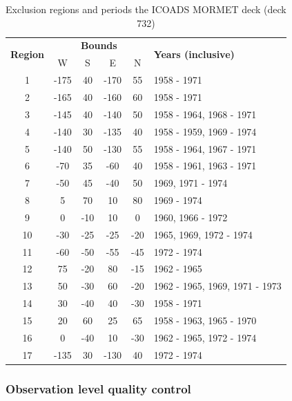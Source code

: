 \begin{table}
\centering
\caption{Exclusion regions and periods the ICOADS MORMET deck (deck 732)}
\label{tab:mormet}
\begin{tabular}{|c|c|c|c|c|l|}
\hline
\multirow{2}{*}{\bfseries Region} & \multicolumn{4}{c|}{\bfseries Bounds } & \multirow{2}{*}{\bfseries Years (inclusive)} \\ \cline{2-5}
   &   W  &  S  &    E &   N & \\\hline
1  & -175 &  40 & -170 &  55 & 1958 - 1971 \\\hline
2  & -165 &  40 & -160 &  60 & 1958 - 1971 \\\hline
3  & -145 &  40 & -140 &  50 & 1958 - 1964, 1968 - 1971 \\\hline
4  & -140 &  30 & -135 &  40 & 1958 - 1959, 1969 - 1974 \\\hline
5  & -140 &  50 & -130 &  55 & 1958 - 1964, 1967 - 1971 \\\hline
6  &  -70 &  35 &  -60 &  40 & 1958 - 1961, 1963 - 1971 \\\hline
7  &  -50 &  45 &  -40 &  50 & 1969, 1971 - 1974 \\\hline
8  &    5 &  70 &   10 &  80 & 1969 - 1974 \\\hline
9  &    0 & -10 &   10 &   0 & 1960, 1966 - 1972 \\\hline
10 &  -30 & -25 &  -25 & -20 & 1965, 1969, 1972 - 1974 \\\hline
11 &  -60 & -50 &  -55 & -45 & 1972 - 1974 \\\hline
12 &   75 & -20 &   80 & -15 & 1962 - 1965 \\\hline
13 &   50 & -30 &   60 & -20 & 1962 - 1965, 1969, 1971 - 1973 \\\hline
14 &   30 & -40 &   40 & -30 & 1958 - 1971 \\\hline
15 &   20 &  60 &   25 &  65 & 1958 - 1963, 1965 - 1970 \\\hline
16 &    0 & -40 &   10 & -30 & 1962 - 1965, 1972 - 1974 \\\hline
17 & -135 &  30 & -130 &  40 & 1972 - 1974 \\\hline
\end{tabular}
\end{table}


\subsubsection{Observation level quality control} \label{obs-qc}

